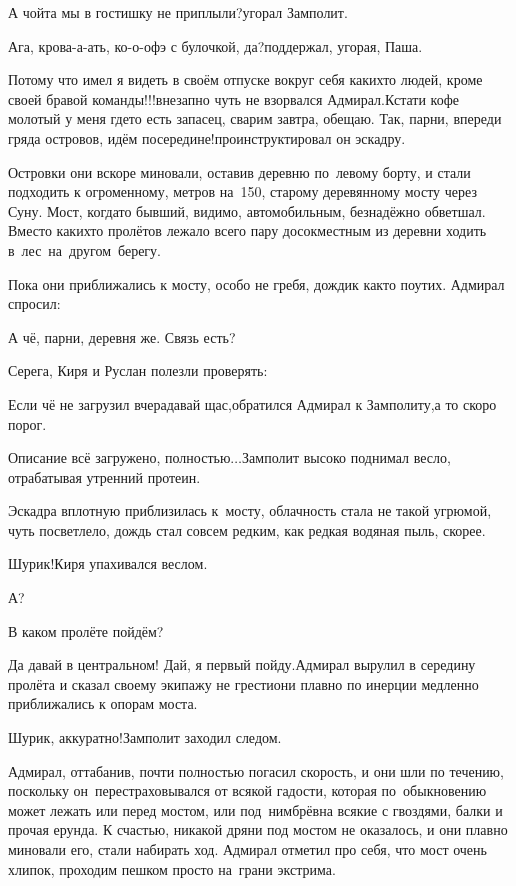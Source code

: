 \diagdash А чойта мы в гостишку не приплыли?\mdash угорал Замполит.

\diagdash Ага, крова-а-ать, ко-о-офэ с булочкой, да?\mdash поддержал, угорая, Паша.

\diagdash Потому что имел я видеть в своём отпуске вокруг себя каких\sdash то людей, кроме своей бравой команды!!!\mdash внезапно чуть не взорвался Адмирал.\mdash Кстати кофе молотый у меня где\sdash то есть запасец, сварим завтра, обещаю. Так, парни, впереди гряда островов, идём посередине!\mdash проинструктировал он эскадру.

Островки они вскоре миновали, оставив деревню по~левому борту, и стали подходить к огроменному, метров на~150, старому деревянному мосту через Суну. Мост, когда\sdash то бывший, видимо, автомобильным, безнадёжно обветшал. Вместо каких\sdash то пролётов лежало всего пару досок\mdash местным из деревни ходить в~лес~на~другом~берегу.

Пока они приближались к мосту, особо не гребя, дождик как\sdash то поутих. Адмирал спросил:

\diagdash А чё, парни, деревня же. Связь есть?

Серега, Киря и Руслан полезли проверять:

\diagdash Если чё не загрузил вчера\mdash давай щас,\mdash обратился Адмирал к Замполиту,\mdash а то скоро порог.

\diagdash Описание всё загружено, полностью$\ldots$\mdash Замполит высоко поднимал весло, отрабатывая утренний протеин.

Эскадра вплотную приблизилась к~мосту, облачность стала не такой угрюмой, чуть посветлело, дождь стал совсем редким, как редкая водяная пыль, скорее. 

\diagdash Шурик!\mdash Киря упахивался веслом.

\diagdash А?

\diagdash В каком пролёте пойдём?

\diagdash Да давай в центральном! Дай, я первый пойду.\mdash Адмирал вырулил в середину пролёта и сказал своему экипажу не грести\mdash они плавно по инерции медленно приближались к опорам моста. 

\diagdash Шурик, аккуратно!\mdash Замполит заходил следом.

Адмирал, оттабанив, почти полностью погасил скорость, и они шли по течению, поскольку он~перестраховывался от всякой гадости, которая по~обыкновению может лежать или перед мостом, или под~ним\mdash брёвна всякие с гвоздями, балки и прочая ерунда. К счастью, никакой дряни под мостом не оказалось, и они плавно миновали его, стали набирать ход. Адмирал отметил про себя, что мост очень хлипок, проходим пешком просто на~грани экстрима.

